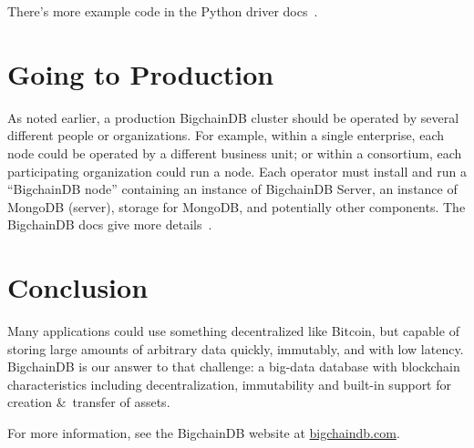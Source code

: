 \documentclass[a4paper]{article}
\begin{document}
There's more example code
in the Python driver docs~\cite{bigchaindb_python_driver}.


\section{Going to Production}

As noted earlier, a production BigchainDB cluster should be operated
by several different people or organizations.
For example, within a single enterprise,
each node could be operated by a different business unit;
or within a consortium, each participating organization could run a node.
Each operator must install and run a ``BigchainDB node''
containing an instance of BigchainDB Server,
an instance of MongoDB (server),
storage for MongoDB,
and potentially other components.
The BigchainDB docs give more details~\cite{bigchaindb_prod_nodes}.


\section{Conclusion}

Many applications could use something decentralized like Bitcoin,
but capable of storing large amounts of arbitrary data quickly,
immutably, and with low latency.
BigchainDB is our answer to that challenge:
a big-data database with blockchain characteristics
including decentralization, immutability and
built-in support for creation \&~transfer of assets.

For more information, see the BigchainDB website
at \href{https://www.bigchaindb.com/}{bigchaindb.com}.



\end{document}
